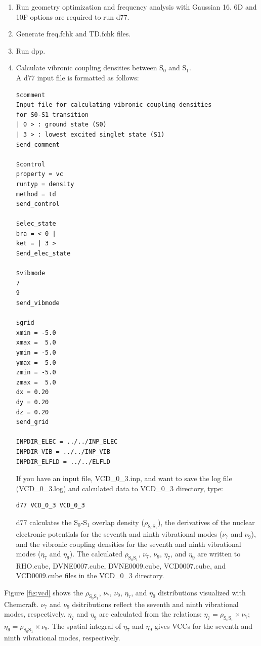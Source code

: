 ﻿\documentclass[11pt,a4paper,openany]{article}
\begin{document}
\begin{enumerate}

\item{Run geometry optimization and frequency analysis with Gaussian 16. 6D and 10F options are required to run d77.}
\item{Generate freq.fchk and TD.fchk files.}
\item{Run dpp.}

\item{
Calculate vibronic coupling densities between S$_0$ and S$_1$.\\
A d77 input file is formatted as follows:
\begin{verbatim}
$comment
Input file for calculating vibronic coupling densities
for S0-S1 transition
| 0 > : ground state (S0)
| 3 > : lowest excited singlet state (S1)
$end_comment

$control
property = vc
runtyp = density
method = td
$end_control

$elec_state
bra = < 0 |
ket = | 3 >
$end_elec_state

$vibmode
7
9
$end_vibmode

$grid
xmin = -5.0
xmax =  5.0
ymin = -5.0
ymax =  5.0
zmin = -5.0
zmax =  5.0
dx = 0.20
dy = 0.20
dz = 0.20
$end_grid

INPDIR_ELEC = ../../INP_ELEC
INPDIR_VIB = ../../INP_VIB
INPDIR_ELFLD = ../../ELFLD
\end{verbatim}
If you have an input file, VCD\_0\_3.inp, and want to save the log file (VCD\_0\_3.log) and calculated data to VCD\_0\_3 directory, type:
\begin{verbatim} 
d77 VCD_0_3 VCD_0_3
\end{verbatim}
d77 calculates the S$_0$-S$_1$ overlap density ($\rho_{\mathrm{S}_0\mathrm{S}_1}$), 
the derivatives of the nuclear electronic potentials for the seventh and ninth vibrational modes ($\nu_7$ and $\nu_9$),
and the vibronic coupling densities for the seventh and ninth vibrational modes ($\eta_7$ and $\eta_9$).
The calculated $\rho_{\mathrm{S}_0\mathrm{S}_1}$, $\nu_7$, $\nu_9$, $\eta_7$, and $\eta_9$
are written to RHO.cube, DVNE0007.cube, DVNE0009.cube, VCD0007.cube, and VCD0009.cube files 
in the VCD\_0\_3 directory.
}
\end{enumerate}

\indent
Figure \ref{fig:vcd} shows the $\rho_{\mathrm{S}_0\mathrm{S}_1}$, $\nu_7$, $\nu_9$, $\eta_7$, and $\eta_9$ distributions visualized with Chemcraft. $\nu_7$ and $\nu_9$ dsitributions reflect the seventh and ninth vibrational modes, respectively. $\eta_7$ and $\eta_9$ are calculated from the relations: $\eta_7 = \rho_{\mathrm{S}_0\mathrm{S}_1} \times \nu_7$; $\eta_9 = \rho_{\mathrm{S}_0\mathrm{S}_1} \times \nu_9$. The spatial integral of $\eta_7$ and $\eta_9$ gives VCCs for the seventh and ninth vibrational modes, respectively.
\end{document}

